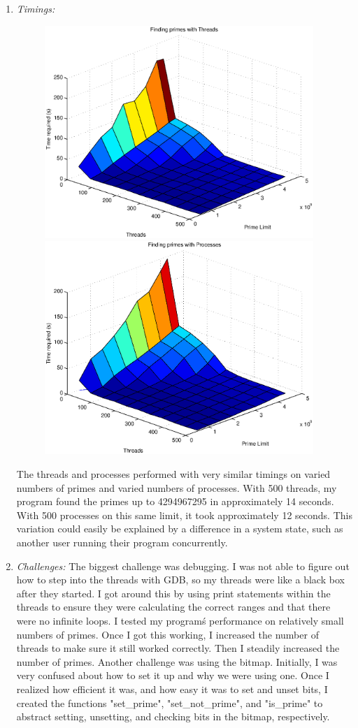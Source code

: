\documentclass[letterpaper,10pt,titlepage]{article}
\begin{document}
\begin{enumerate}
\item \emph{Timings:}
\begin{figure}[H] %
  \includegraphics[width=4in]{tplot}
  \includegraphics[width=4in]{pplot}
\end{figure}

The threads and processes performed with very similar timings on varied numbers of primes and varied numbers of processes. With 500 threads, my program found the primes up to 4294967295 in approximately 14 seconds. With 500 processes on this same limit, it took approximately 12 seconds. This variation could easily be explained by a difference in a system state, such as another user running their program concurrently.

\item \emph{Challenges:}
The biggest challenge was debugging. I was not able to figure out how to step into the threads with GDB, so my threads were like a black box after they started. I got around this by using print statements within the threads to ensure they were calculating the correct ranges and that there were no infinite loops. I tested my program\'s performance on relatively small numbers of primes. Once I got this working, I increased the number of threads to make sure it still worked correctly. Then I steadily increased the number of primes. Another challenge was using the bitmap. Initially, I was very confused about how to set it up and why we were using one. Once I realized how efficient it was, and how easy it was to set and unset bits, I created the functions "set\_prime", "set\_not\_prime", and "is\_prime" to abstract setting, unsetting, and checking bits in the bitmap, respectively.


\end{enumerate}
\end{document}

